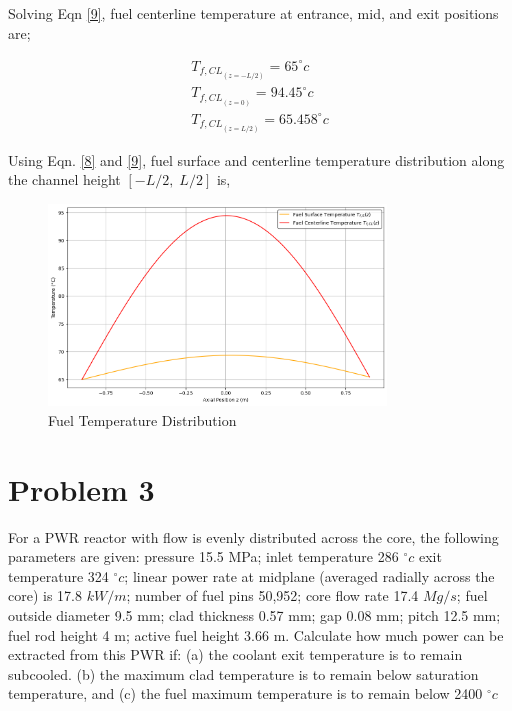 \documentclass[12pt]{article}
\begin{document}
Solving Eqn \ref{9}, fuel centerline temperature at entrance, mid, and exit positions are;
\begin{tcolorbox}
\begin{equation*}
    \begin{gathered}
        T_{{f, CL}_{(z=-L/2)}} = 65 ^{\circ}c \\
        T_{{f, CL}_{(z=0)}} = 94.45 ^{\circ}c \\
        T_{{f, CL}_{(z=L/2)}} = 65.458 ^{\circ}c   
    \end{gathered}
\end{equation*}
\end{tcolorbox}

Using Eqn. \ref{8} and \ref{9}, fuel surface and centerline temperature distribution along the channel height $[-L/2, \;L/2]$ is,

\begin{figure}[h!]
\centering
    \includegraphics[width=0.8\textwidth]{surface_temperature_distribution.png}
    \caption{Fuel Temperature Distribution}
    \label{1}
\end{figure}

\section*{Problem 3}
For a PWR reactor with flow is evenly distributed across the core, the following parameters are given: pressure 15.5 MPa; inlet temperature 286 $^\circ c$  exit temperature 324 $^\circ c$; linear power rate 
at midplane (averaged radially across the core) is 17.8 $kW/m$;  number of fuel pins 50,952; core flow rate 17.4 $Mg/s$; fuel outside diameter 9.5 mm; clad thickness 0.57 mm; gap 0.08 mm; pitch 12.5 mm; fuel rod height 4 m; active fuel height 3.66 m. Calculate how much power can be extracted from this PWR if: (a) the coolant exit temperature is to remain subcooled. (b) the  maximum clad temperature is to remain below saturation temperature, and (c) the fuel  maximum temperature is to remain below 2400 $^\circ c$
\end{document}
